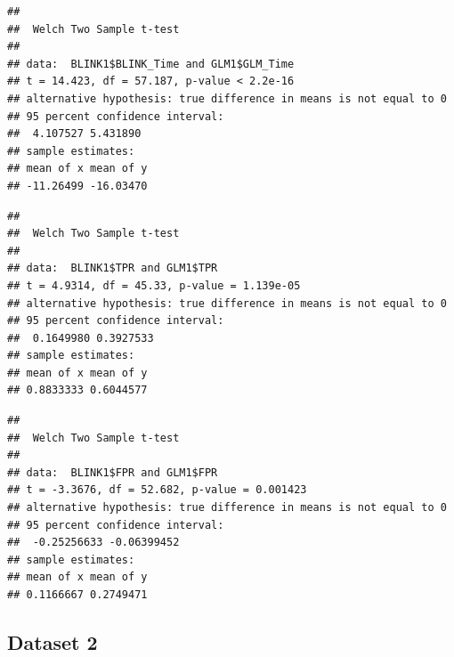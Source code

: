 \documentclass[
]{article}
\newenvironment{Shaded}{\begin{snugshade}}{\end{snugshade}}
\newcommand{\CommentTok}[1]{\textcolor[rgb]{0.56,0.35,0.01}{\textit{#1}}}
\newcommand{\KeywordTok}[1]{\textcolor[rgb]{0.13,0.29,0.53}{\textbf{#1}}}
\newcommand{\NormalTok}[1]{#1}
\newcommand{\OperatorTok}[1]{\textcolor[rgb]{0.81,0.36,0.00}{\textbf{#1}}}
\begin{document}
\begin{verbatim}
## 
##  Welch Two Sample t-test
## 
## data:  BLINK1$BLINK_Time and GLM1$GLM_Time
## t = 14.423, df = 57.187, p-value < 2.2e-16
## alternative hypothesis: true difference in means is not equal to 0
## 95 percent confidence interval:
##  4.107527 5.431890
## sample estimates:
## mean of x mean of y 
## -11.26499 -16.03470
\end{verbatim}

\begin{Shaded}
\end{Shaded}

\begin{verbatim}
## 
##  Welch Two Sample t-test
## 
## data:  BLINK1$TPR and GLM1$TPR
## t = 4.9314, df = 45.33, p-value = 1.139e-05
## alternative hypothesis: true difference in means is not equal to 0
## 95 percent confidence interval:
##  0.1649980 0.3927533
## sample estimates:
## mean of x mean of y 
## 0.8833333 0.6044577
\end{verbatim}

\begin{Shaded}
\end{Shaded}

\begin{verbatim}
## 
##  Welch Two Sample t-test
## 
## data:  BLINK1$FPR and GLM1$FPR
## t = -3.3676, df = 52.682, p-value = 0.001423
## alternative hypothesis: true difference in means is not equal to 0
## 95 percent confidence interval:
##  -0.25256633 -0.06399452
## sample estimates:
## mean of x mean of y 
## 0.1166667 0.2749471
\end{verbatim}

\hypertarget{dataset-2}{%
\subsection{Dataset 2}\label{dataset-2}}
\end{document}
